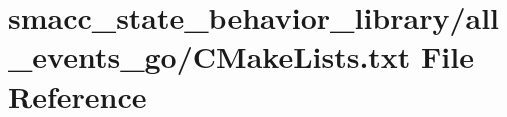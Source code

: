 \hypertarget{state__behavior__library_2all__events__go_2CMakeLists_8txt}{}\section{smacc\+\_\+state\+\_\+behavior\+\_\+library/all\+\_\+events\+\_\+go/\+C\+Make\+Lists.txt File Reference}
\label{state__behavior__library_2all__events__go_2CMakeLists_8txt}
